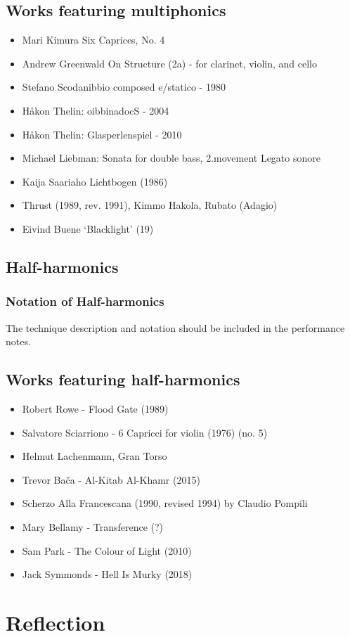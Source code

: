 \subsection{Works featuring multiphonics} \label{sec:multiphonicsLiterature}

\begin{itemize}
    \item Mari Kimura Six Caprices, No. 4 
    \item Andrew Greenwald On Structure (2a) - for clarinet, violin, and cello
    \item Stefano Scodanibbio composed e/statico - 1980
    \item Håkon Thelin: oibbinadocS - 2004
    \item Håkon Thelin: Glasperlenspiel - 2010
    \item Michael Liebman: Sonata for double bass, 2.movement Legato sonore
    \item Kaija Saariaho Lichtbogen (1986)
    \item Thrust (1989, rev. 1991),  Kimmo Hakola, Rubato (Adagio) 
    \item Eivind Buene `Blacklight' (19)
\end{itemize}

\subsection{Half-harmonics} \label{sec:half-harmonics}

\subsubsection{Notation of Half-harmonics}

The technique description and notation should be included in the performance notes.


\subsection{Works featuring half-harmonics} \label{sec:half-harmonicsLiterature}

\begin{itemize}
    \item Robert Rowe - Flood Gate (1989)
    \item Salvatore Sciarriono - 6 Capricci for violin (1976) (no. 5)
    \item Helmut Lachenmann, Gran Torso
    \item Trevor Bača - Al-Kitab Al-Khamr (2015)
    \item Scherzo Alla Francescana (1990, revised 1994) by Claudio Pompili 
    \item Mary Bellamy - Transference (?)
    \item Sam Park - The Colour of Light (2010)
    \item Jack Symmonds - Hell Is Murky (2018)
\end{itemize}

\section{Reflection}




\lipsum[4]